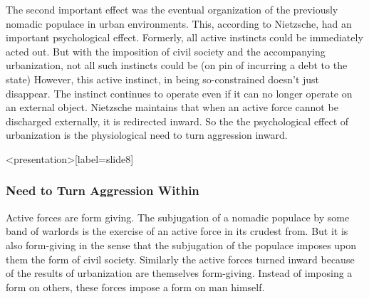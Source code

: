 The second important effect was the eventual organization of the previously
nomadic populace in urban environments. This, according to Nietzsche, had an
important psychological effect. Formerly, all active instincts could be
immediately acted out. But with the imposition of civil society and the
accompanying urbanization, not all such instincts could be (on pin of
incurring a debt to the state) However, this active instinct, in being
so-constrained doesn't just disappear. The instinct continues to operate even if it can no longer operate on an external object. Nietzsche maintains that when an active force cannot be discharged externally, it is redirected inward. So the the psychological effect of urbanization is the physiological need to turn aggression inward.
\change

\begin{frame}<presentation>[label=slide8]
    \frametitle{Need to Turn Aggression Within}
\end{frame}

Active forces are form giving. The subjugation of a nomadic populace by some band of warlords is the exercise of an active force in its crudest from. But it is also form-giving in the sense that the subjugation of the populace imposes upon them the form of civil society. Similarly the active forces turned inward because of the results of urbanization are themselves form-giving. Instead of imposing a form on others, these forces impose a form on man himself. 

